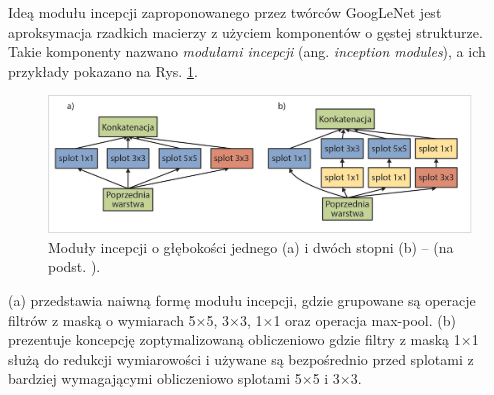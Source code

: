 Ideą modułu incepcji zaproponowanego przez twórców GoogLeNet jest aproksymacja rzadkich macierzy z użyciem komponentów o gęstej strukturze. Takie komponenty nazwano \textit{modułami incepcji} (ang. \textit{inception modules}), a ich przykłady pokazano na Rys. \ref{GoogleNetInceptionModules}. 
\begin{figure}[t!]
	\centering
	\includegraphics[width=1\textwidth]{figures/InceptionModules.jpg}
	\caption{Moduły incepcji o głębokości jednego (a) i dwóch stopni (b) -- (na podst. \cite{GoogleNet}).}
	\label{GoogleNetInceptionModules}
\end{figure}
(a) przedstawia naiwną formę modułu incepcji, gdzie grupowane są operacje filtrów z maską o wymiarach 5$\times$5, 3$\times$3, 1$\times$1 oraz operacja max-pool. (b) prezentuje koncepcję zoptymalizowaną obliczeniowo gdzie filtry z maską 1$\times$1 służą do redukcji wymiarowości i używane są bezpośrednio przed splotami z bardziej wymagającymi obliczeniowo splotami 5$\times$5 i 3$\times$3. 

